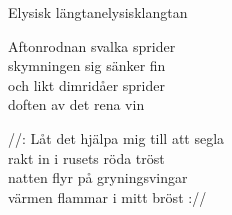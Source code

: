 \begin{song}{Elysisk längtan}{elysisklangtan}
\begin{vers}
Aftonrodnan svalka sprider\\
skymningen sig sänker fin\\
och likt dimridåer sprider\\
doften av det rena vin\\
\end{vers}
\begin{vers}
//: Låt det hjälpa mig till att segla\\
rakt in i rusets röda tröst\\
natten flyr på gryningsvingar\\
värmen flammar i mitt bröst ://\\
\end{vers}
\end{song}
